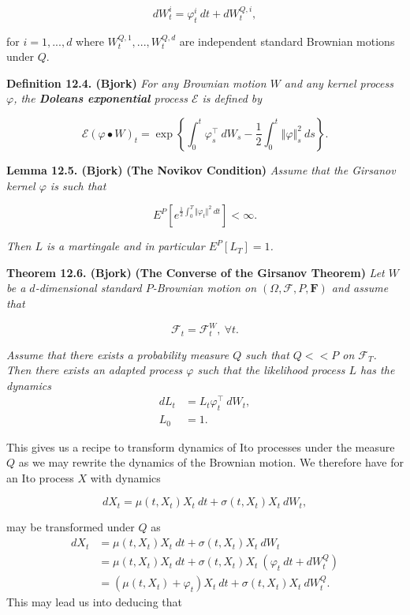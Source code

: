 \documentclass[
]{book}
\begin{document}
\[
dW_t^i=\varphi_t^i\ dt+dW_t^{Q,i},
\]

for \(i=1,...,d\) where \(W_t^{Q,1},...,W_t^{Q,d}\) are independent standard Brownian motions under \(Q\).

\textbf{Definition 12.4. (Bjork)} \emph{For any Brownian motion \(W\) and any kernel process \(\varphi\), the \textbf{Doleans exponential} process \(\mathcal{E}\) is defined by}

\[
\mathcal{E}(\varphi\bullet W)_t=\exp\left\{\int_0^t\varphi^\top_s\ dW_s -\frac{1}{2}\int_0^t\Vert \varphi\Vert^2_s\ ds\right\}.\tag{12.24}
\]

\textbf{Lemma 12.5. (Bjork)} \textbf{(The Novikov Condition)} \emph{Assume that the Girsanov kernel \(\varphi\) is such that}

\[
E^P\left[e^{\frac{1}{2}\int_0^T\Vert \varphi_t\Vert^2\ dt}\right]<\infty.\tag{12.27}
\]

\emph{Then \(L\) is a martingale and in particular \(E^P[L_T]=1\).}

\textbf{Theorem 12.6. (Bjork)} \textbf{(The Converse of the Girsanov Theorem)} \emph{Let \(W\) be a \(d\)-dimensional standard \(P\)-Brownian motion on \((\Omega,\mathcal{F},P,\mathbf{F})\) and assume that}

\[
\mathcal{F}_t=\mathcal{F}^W_t,\ \forall t.
\]

\emph{Assume that there exists a probability measure \(Q\) such that \(Q<<P\) on \(\mathcal{F}_T\). Then there exists an adapted process \(\varphi\) such that the likelihood process \(L\) has the dynamics}
\begin{align*}
dL_t&=L_t\varphi^\top_t\ dW_t,\\
L_0&=1.
\end{align*}

This gives us a recipe to transform dynamics of Ito processes under the measure \(Q\) as we may rewrite the dynamics of the Brownian motion. We therefore have for an Ito process \(X\) with dynamics

\[
dX_t=\mu(t,X_t)X_t\ dt+\sigma(t,X_t) X_t\ dW_t,
\]

may be transformed under \(Q\) as
\begin{align*}
dX_t&=\mu(t,X_t)X_t\ dt+\sigma(t,X_t) X_t\ dW_t\\
&=\mu(t,X_t)X_t\ dt+\sigma(t,X_t) X_t\ (\varphi_t\ dt+dW_t^Q)\\
&=\left(\mu(t,X_t) + \varphi_t\right) X_t\ dt + \sigma(t,X_t)X_t\ dW_t^Q.
\end{align*}
This may lead us into deducing that
\end{document}

